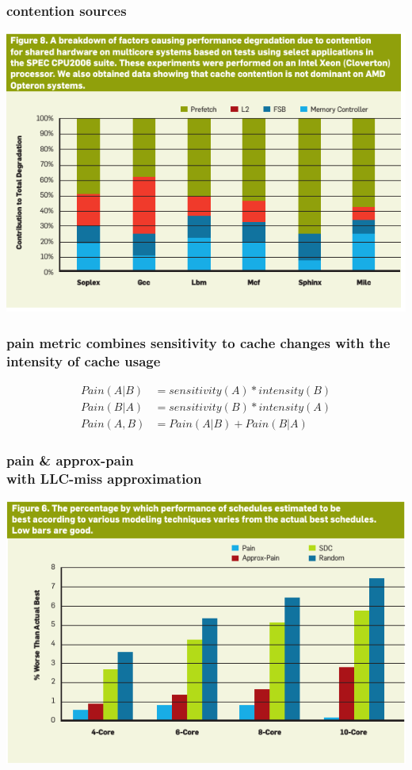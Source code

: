 \documentclass[utf8,10pt]{beamer}
\begin{document}
\begin{frame}
  \frametitle{contention sources }
  \centering
  \includegraphics[height=0.7\textheight, keepaspectratio]{./contention_shared_hw}
\end{frame}


\begin{frame}
  \frametitle{pain metric combines sensitivity to cache
    changes with the intensity of cache usage}
  \centering
  \begin{align*}
    Pain(A|B) &= sensitivity(A) * intensity(B) \\
    Pain(B|A) &= sensitivity(B) * intensity(A) \\
    Pain(A,B) &= Pain(A|B) + Pain(B|A)
  \end{align*}
\end{frame}


\begin{frame}
  \frametitle{pain \& approx-pain \\ with LLC-miss approximation
    }
  \centering
  \includegraphics[height=0.7\textheight, keepaspectratio]{./pain_approx_comp}
\end{frame}
\end{document}
